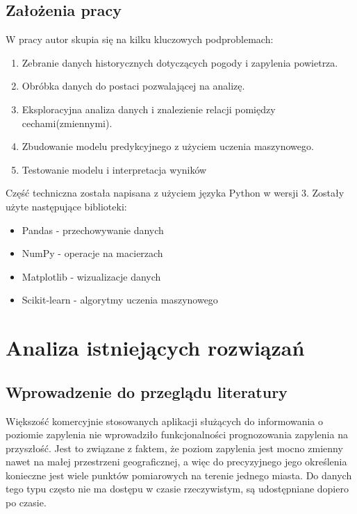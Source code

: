 \documentclass[a4paper,12pt,twoside,openany]{report}
\begin{document}
\section{Założenia pracy}

W pracy autor skupia się na kilku kluczowych podproblemach:

\begin{enumerate}
	\item Zebranie danych historycznych dotyczących pogody i zapylenia powietrza.
	\item Obróbka danych do postaci pozwalającej na analizę.
	\item Eksploracyjna analiza danych i znalezienie relacji pomiędzy cechami(zmiennymi).
	\item Zbudowanie modelu predykcyjnego z użyciem uczenia maszynowego.	
	\item Testowanie modelu i interpretacja wyników	
\end{enumerate}

Część techniczna została napisana z użyciem języka Python w wersji 3. Zostały użyte następujące biblioteki:

\begin{itemize}
	\item Pandas - przechowywanie danych
	\item NumPy - operacje na macierzach
	\item Matplotlib - wizualizacje danych
	\item Scikit-learn - algorytmy uczenia maszynowego
\end{itemize}

\chapter{Analiza istniejących rozwiązań}

\section{Wprowadzenie do przeglądu literatury}
Większość komercyjnie stosowanych aplikacji służących do informowania o poziomie zapylenia nie wprowadziło funkcjonalności prognozowania zapylenia na przyszłość. Jest to związane z faktem, że poziom zapylenia jest mocno zmienny nawet na małej przestrzeni geograficznej, a więc do precyzyjnego jego określenia konieczne jest wiele punktów pomiarowych na terenie jednego miasta. Do danych tego typu często nie ma dostępu w czasie rzeczywistym, są udostępniane dopiero po czasie.
\end{document}
